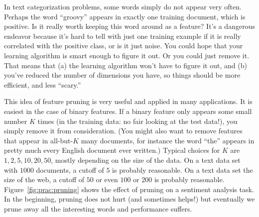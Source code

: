 In text categorization problems, some words simply do not appear very
often.  Perhaps the word ``groovy''
appears in exactly one training document, which is positive.  Is it
really worth keeping this word around as a feature?  It's a dangerous
endeavor because it's hard to tell with just one training example if
it is really correlated with the positive class, or is it just noise.
You could hope that your learning algorithm is smart enough to figure
it out.  Or you could just remove it.  That means that (a) the
learning algorithm won't have to figure it out, and (b) you've reduced
the number of dimensions you have, so things should be more efficient,
and less ``scary.''


This idea of feature pruning is very useful and applied in many
applications.  It is easiest in the case of binary features.  If a
binary feature only appears some small number $K$ times (in the
training data: no fair looking at the test data!), you simply remove
it from consideration.  (You might also want to remove features that
appear in all-but-$K$ many documents, for instance the word ``the''
appears in pretty much every English document ever written.)  Typical
choices for $K$ are $1, 2, 5, 10, 20, 50$, mostly depending on the
size of the data.  On a text data set with $1000$ documents, a cutoff
of $5$ is probably reasonable.  On a text data set the size of the
web, a cutoff of $50$ or even $100$ or $200$ is probably
reasonable.
Figure~\ref{fig:prac:pruning} shows the effect of pruning on a
sentiment analysis task.  In the beginning, pruning does not hurt (and
sometimes helps!) but eventually we prune away all the interesting
words and performance suffers.


